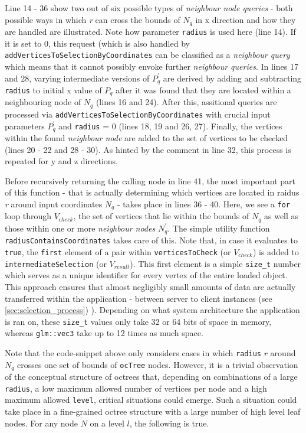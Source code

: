 Line 14 - 36 show two out of six possible types of \textit{neighbour node queries} - both possible ways in which \textit{r} can cross the bounds of $N_q$ in x direction and how they are handled are illustrated. Note how parameter \texttt{radius} is used here (line 14). If it is set to 0, this request (which is also handled by \texttt{addVerticesToSelectionByCoordinates} can be classified as a \textit{neighbour query} which means that it cannot possibly envoke further \textit{neighbour queries}. In lines 17 and 28, varying intermediate versions of $P_{q}^{'}$ are derived by adding and subtracting \texttt{radius} to initial x value of $P_{q}$ after it was found that they are located within a neighbouring node of $N_q$ (lines 16 and 24). After this, assitional queries are processed via \texttt{addVerticesToSelectionByCoordinates} with crucial input parameters $P_{q}^{'}$ and \texttt{radius} = 0 (lines 18, 19 and 26, 27). Finally, the vertices within the found \textit{neighbour node} are added to the set of vertices to be checked (lines 20 - 22 and 28 - 30). As hinted by the comment in line 32, this process is repeated for y and z directions.

Before recursively returning the calling node in line 41, the most important part of this function - that is actually determining which vertices are located in raidus \textit{r} around input coordinates $N_q$ - takes place in lines 36 - 40. Here, we see a \texttt{for} loop through $V_{check}$, the set of vertices that lie within the bounds of $N_q$ as well as those within one or more \textit{neighbour nodes} $N_q^{'}$. The simple utility function \texttt{radiusContainsCoordinates} takes care of this. Note that, in case it evaluates to \texttt{true}, the \texttt{first} element of a pair within \texttt{verticesToCheck} (or $V_{check}$) is added to \texttt{intermediateSelection} (or $V_{result}$). This first element is a simple \texttt{size\_t} number which serves as a unique identifier for every vertex of the entire loaded object. This approach ensures that almost negligibly small amounts of data are actually transferred within the application - between server to client instances (see
\ref{sec:selection_process})
). Depending on what system architecture the application is ran on, these \texttt{size\_t} values only take 32 or 64 bits of space in memory, whereas \texttt{glm::vec3} take up to 12 times as much space.

Note that the code-snippet above only considers cases in which \texttt{radius} $r$ around $N_q$ crosses one set of bounds of \texttt{ocTree} nodes. However, it is a trivial observation of the conceptual structure of octrees that, depending on combinations of a large \texttt{radius}, a low maximum allowed number of vertices per node and a high maximum allowed \texttt{level}, critical situations could emerge. Such a situation could take place in a fine-grained octree structure with a large number of high level leaf nodes. For any node $N$ on a level $l$, the following is true.

